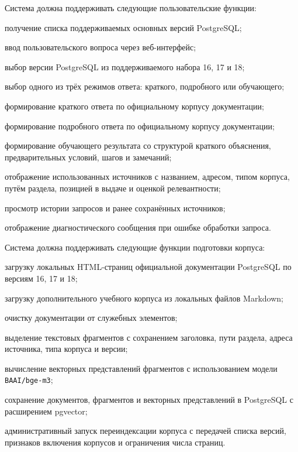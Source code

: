 

Система должна поддерживать следующие пользовательские функции:

\begin{compactlist}
  \item получение списка поддерживаемых основных версий PostgreSQL;
  \item ввод пользовательского вопроса через веб-интерфейс;
  \item выбор версии PostgreSQL из поддерживаемого набора 16, 17 и 18;
  \item выбор одного из трёх режимов ответа: краткого, подробного или обучающего;
  \item формирование краткого ответа по официальному корпусу документации;
  \item формирование подробного ответа по официальному корпусу документации;
  \item формирование обучающего результата со структурой краткого объяснения, предварительных условий, шагов и замечаний;
  \item отображение использованных источников с названием, адресом, типом корпуса, путём раздела, позицией в выдаче и оценкой релевантности;
  \item просмотр истории запросов и ранее сохранённых источников;
  \item отображение диагностического сообщения при ошибке обработки запроса.
\end{compactlist}

Система должна поддерживать следующие функции подготовки корпуса:

\begin{compactlist}
  \item загрузку локальных HTML-страниц официальной документации PostgreSQL по версиям 16, 17 и 18;
  \item загрузку дополнительного учебного корпуса из локальных файлов Markdown;
  \item очистку документации от служебных элементов;
  \item выделение текстовых фрагментов с сохранением заголовка, пути раздела, адреса источника, типа корпуса и версии;
  \item вычисление векторных представлений фрагментов с использованием модели \texttt{BAAI/bge-m3};
  \item сохранение документов, фрагментов и векторных представлений в PostgreSQL с расширением pgvector;
  \item административный запуск переиндексации корпуса с передачей списка версий, признаков включения корпусов и ограничения числа страниц.
\end{compactlist}

